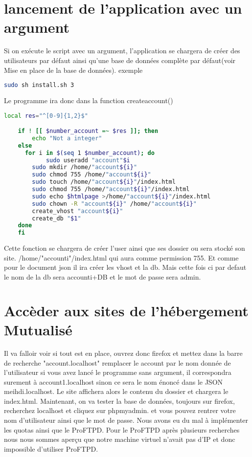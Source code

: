 \documentclass{article}
\begin{document}
\section{lancement de l'application avec un argument}

	Si on exécute le script avec un argument, l'application se chargera de créer des utilisateurs par défaut ainsi qu'une base de données complète par défaut(voir Mise en place de la base de données).
	exemple 
		\begin{lstlisting}[language=bash]
			sudo sh install.sh 3
		\end{lstlisting}

	Le programme ira donc dans la function createaccount() 

\begin{lstlisting}[language=bash]
	local res="^[0-9]{1,2}$"

	if ! [[ $number_account =~ $res ]]; then
		echo "Not a integer"
	else
	  for i in $(seq 1 $number_account); do
	     	sudo useradd "account"$i
		sudo mkdir /home/"account${i}"
		sudo chmod 755 /home/"account${i}"
		sudo touch /home/"account${i}"/index.html
		sudo chmod 755 /home/"account${i}"/index.html
		sudo echo $htmlpage >/home/"account${i}"/index.html
		sudo chown -R "account${i}" /home/"account${i}"
		create_vhost "account${i}"
		create_db "$1"
	done
	fi
\end{lstlisting}

	Cette fonction se chargera de créer l'user ainsi que ses dossier ou sera stocké son site. /home/"account{i}"/index.html
	qui aura comme permission 755. Et comme pour le document json il ira créer les vhost et la db. Mais cette fois ci par defaut 
	le nom de la db sera accounti+DB et le mot de passe sera admin.	


\section{Accèder aux sites de l'hébergement Mutualisé}

	Il va falloir voir si tout est en place, ouvrez donc firefox et mettez dans la barre de recherche "account.localhost" remplacer le account par le nom donnée de l'utilisateur
	si vous avez lancé le programme sans argument, il correspondra surement à account1.localhost sinon ce sera le nom énoncé dans le JSON meihdi.localhost.
	Le site affichera alors le contenu du dossier et chargera le index.html. Maintenant, on va tester la base de données, toujours sur firefox, recherchez localhost et cliquez sur phpmyadmin.
	et vous pouvez rentrer votre nom d'utilisateur ainsi que le mot de passe. 
	Nous avons eu du mal à implémenter les quotas ainsi que le ProFTPD. Pour le ProFTPD après plusieurs recherches nous nous sommes aperçu que notre machine virtuel n'avait pas d'IP et donc 
	impossible d'utiliser ProFTPD.
	
\end{document}
